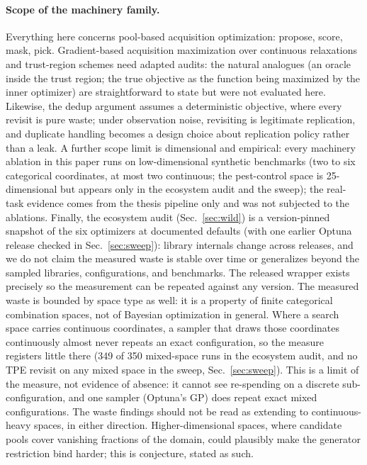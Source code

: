 \documentclass[%
 aip,
 amsmath,amssymb,
 floatfix,
 reprint,%
]{revtex4-1}
\begin{document}
\paragraph{Scope of the machinery family.}
Everything here concerns pool-based acquisition optimization: propose,
score, mask, pick. Gradient-based acquisition maximization over
continuous relaxations and trust-region schemes need adapted audits:
the natural analogues (an oracle inside the trust region; the true
objective as the function being maximized by the inner optimizer) are
straightforward to state but were not evaluated here. Likewise, the
dedup argument assumes a deterministic objective, where every revisit is
pure waste; under observation noise, revisiting is legitimate
replication, and duplicate handling becomes a design choice about
replication policy rather than a leak. A further scope limit is
dimensional and empirical: every machinery ablation in this paper runs
on low-dimensional synthetic benchmarks (two to six categorical
coordinates, at most two continuous; the pest-control space is
25-dimensional but appears only in the ecosystem audit and the
sweep); the real-task
evidence comes from the thesis pipeline only and was not subjected to
the ablations. Finally, the ecosystem audit (Sec.~\ref{sec:wild}) is a
version-pinned snapshot of the six optimizers at documented defaults
(with one earlier Optuna release checked in Sec.~\ref{sec:sweep}):
library internals change across releases, and we do not claim the
measured waste is stable over time or generalizes beyond the sampled
libraries, configurations, and benchmarks. The released wrapper
exists precisely so the measurement can be repeated against any version.
The measured waste is bounded by space type as well: it is a property
of finite categorical combination spaces, not of Bayesian optimization
in general. Where a search space carries continuous coordinates, a sampler that
draws those coordinates continuously almost never repeats an exact
configuration, so the measure registers little there (349 of 350
mixed-space runs in the ecosystem audit, and no TPE revisit on any
mixed space in the sweep, Sec.~\ref{sec:sweep}). This is a limit of
the measure, not evidence of absence: it cannot see re-spending on a
discrete sub-configuration, and one sampler (Optuna's GP) does repeat
exact mixed configurations. The waste findings should not be read as
extending to continuous-heavy spaces, in either direction.
Higher-dimensional spaces, where candidate pools cover vanishing
fractions of the domain, could plausibly make the generator restriction
bind harder; this is conjecture, stated as such.
\end{document}
